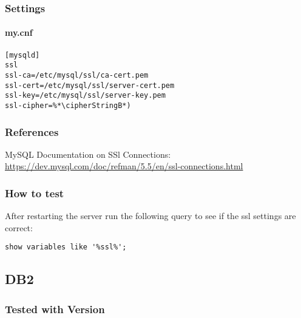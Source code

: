 \subsubsection{Settings}
\paragraph*{my.cnf}
\begin{lstlisting}
[mysqld]
ssl
ssl-ca=/etc/mysql/ssl/ca-cert.pem
ssl-cert=/etc/mysql/ssl/server-cert.pem
ssl-key=/etc/mysql/ssl/server-key.pem
ssl-cipher=%*\cipherStringB*)
\end{lstlisting}






\subsubsection{References}
\begin{itemize*}
  \item MySQL Documentation on SSl Connections: \url{https://dev.mysql.com/doc/refman/5.5/en/ssl-connections.html}
\end{itemize*}


\subsubsection{How to test}
After restarting the server run the following query to see if the ssl settings are correct:
\begin{lstlisting}
show variables like '%ssl%';
\end{lstlisting}


\subsection{DB2}
\subsubsection{Tested with Version}


